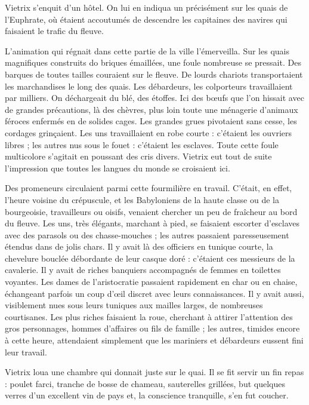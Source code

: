 \documentclass[a4paper, 11pt, oneside, polutonikogreek, french]{article}
\begin{document}
Vietrix s'enquit d'un hôtel. On lui en indiqua un précisément sur les quais de l'Euphrate, où étaient accoutumés de descendre les capitaines des navires qui faisaient le trafic du fleuve.

L'animation qui régnait dans cette partie de la ville l'émerveilla. Sur les quais magnifiques construits do briques émaillées, une foule nombreuse se pressait. Des barques de toutes tailles couraient sur le fleuve. De lourds chariots transportaient les marchandises le long des quais. Les débardeurs, les colporteurs travaillaient par milliers. On déchargeait du blé, des étoffes. Ici des bœufs que l'on hissait avec de grandes précautions, là des chèvres, plus loin toute une ménagerie d'animaux féroces enfermés en de solides cages. Les grandes grues pivotaient sans cesse, les cordages grinçaient. Les uns travaillaient en robe courte : c'étaient les ouvriers libres ; les autres nus sous le fouet : c'étaient les esclaves. Toute cette foule multicolore s'agitait en poussant des cris divers. Vietrix eut tout de suite l'impression que toutes les langues du monde se croisaient ici.

Des promeneurs circulaient parmi cette fourmilière en travail. C'était, en effet, l'heure voisine du crépuscule, et les Babyloniens de la haute classe ou de la bourgeoisie, travailleurs ou oisifs, venaient chercher un peu de fraîcheur au bord du fleuve. Les uns, très élégants, marchant à pied, se faisaient escorter d'esclaves avec des parasols ou des chasse-mouches ; les autres passaient paresseusement étendus dans de jolis chars. Il y avait là des officiers en tunique courte, la chevelure bouclée débordante de leur casque doré : c'étaient ces messieurs de la cavalerie. Il y avait de riches banquiers accompagnés de femmes en toilettes voyantes. Les dames de l'aristocratie passaient rapidement en char ou en chaise, échangeant parfois un coup d'œil discret avec leurs connaissances. Il y avait aussi, visiblement nues sous leurs tuniques aux mailles larges, de nombreuses courtisanes. Les plus riches faisaient la roue, cherchant à attirer l'attention des gros personnages, hommes d'affaires ou fils de famille ; les autres, timides encore à cette heure, attendaient simplement que les mariniers et débardeurs eussent fini leur travail.

Vietrix loua une chambre qui donnait juste sur le quai. Il se fit servir un fin repas : poulet farci, tranche de bosse de chameau, sauterelles grillées, but quelques verres d'un excellent vin de pays et, la conscience tranquille, s'en fut coucher.
\end{document}
